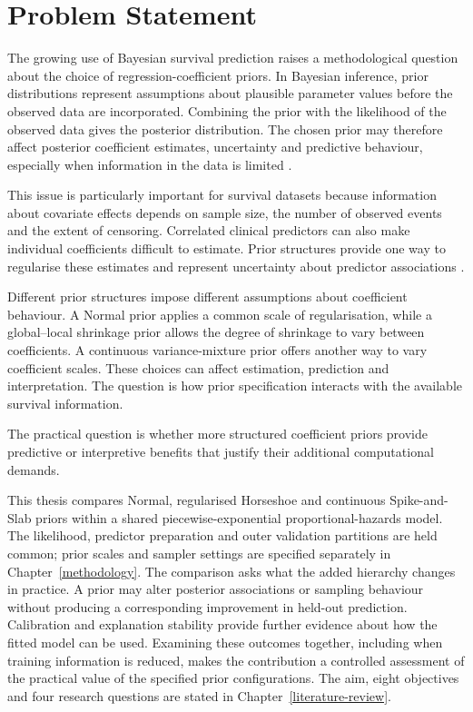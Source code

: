 \section{Problem Statement}\label{problem-statement}

The growing use of Bayesian survival prediction raises a methodological question about the choice of regression-coefficient priors. In Bayesian inference, prior distributions represent assumptions about plausible parameter values before the observed data are incorporated. Combining the prior with the likelihood of the observed data gives the posterior distribution. The chosen prior may therefore affect posterior coefficient estimates, uncertainty and predictive behaviour, especially when information in the data is limited \cite{ref6}.

This issue is particularly important for survival datasets because information about covariate effects depends on sample size, the number of observed events and the extent of censoring. Correlated clinical predictors can also make individual coefficients difficult to estimate. Prior structures provide one way to regularise these estimates and represent uncertainty about predictor associations \cite{ref6}.

Different prior structures impose different assumptions about coefficient behaviour. A Normal prior applies a common scale of regularisation, while a global--local shrinkage prior allows the degree of shrinkage to vary between coefficients. A continuous variance-mixture prior offers another way to vary coefficient scales. These choices can affect estimation, prediction and interpretation. The question is how prior specification interacts with the available survival information.

The practical question is whether more structured coefficient priors provide predictive or interpretive benefits that justify their additional computational demands.

This thesis compares Normal, regularised Horseshoe and continuous Spike-and-Slab priors within a shared piecewise-exponential proportional-hazards model. The likelihood, predictor preparation and outer validation partitions are held common; prior scales and sampler settings are specified separately in Chapter~\ref{methodology}. The comparison asks what the added hierarchy changes in practice. A prior may alter posterior associations or sampling behaviour without producing a corresponding improvement in held-out prediction. Calibration and explanation stability provide further evidence about how the fitted model can be used. Examining these outcomes together, including when training information is reduced, makes the contribution a controlled assessment of the practical value of the specified prior configurations. The aim, eight objectives and four research questions are stated in Chapter~\ref{literature-review}.

